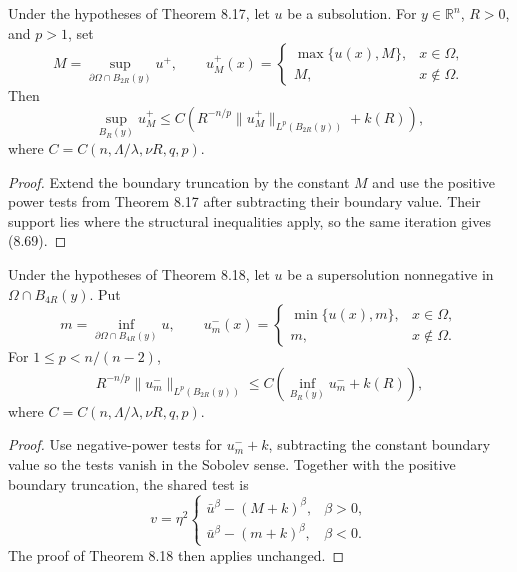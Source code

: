 \begin{theorem}
\label{gt-thm-8-25-boundary-local-boundedness}
Under the hypotheses of Theorem 8.17, let $u$ be a subsolution. For
$y\in\mathbb R^n$, $R>0$, and $p>1$, set
\[
M=\sup_{\partial\Omega\cap B_{2R}(y)}u^+,
\qquad
u_M^+(x)=
\begin{cases}
\max\{u(x),M\},&x\in\Omega,\\
M,&x\notin\Omega.
\end{cases}
\]
Then
\begin{equation}
\sup_{B_R(y)}u_M^+
\leq C\left(R^{-n/p}\|u_M^+\|_{L^p(B_{2R}(y))}+k(R)\right),
\tag{8.69}
\end{equation}
where $C=C(n,\Lambda/\lambda,\nu R,q,p)$.
\end{theorem}
\begin{proof}
\sketch Extend the boundary truncation by the constant $M$ and use the positive
power tests from Theorem 8.17 after subtracting their boundary value. Their
support lies where the structural inequalities apply, so the same iteration gives
(8.69).
\end{proof}

\begin{theorem}
\label{gt-thm-8-26-boundary-weak-harnack}
Under the hypotheses of Theorem 8.18, let $u$ be a supersolution nonnegative in
$\Omega\cap B_{4R}(y)$. Put
\[
m=\inf_{\partial\Omega\cap B_{4R}(y)}u,
\qquad
u_m^-(x)=
\begin{cases}
\min\{u(x),m\},&x\in\Omega,\\
m,&x\notin\Omega.
\end{cases}
\]
For $1\leq p<n/(n-2)$,
\begin{equation}
R^{-n/p}\|u_m^-\|_{L^p(B_{2R}(y))}
\leq C\left(\inf_{B_R(y)}u_m^-+k(R)\right),
\tag{8.70}
\end{equation}
where $C=C(n,\Lambda/\lambda,\nu R,q,p)$.
\end{theorem}
\begin{proof}
\sketch Use negative-power tests for $u_m^-+k$, subtracting the constant boundary
value so the tests vanish in the Sobolev sense. Together with the positive
boundary truncation, the shared test is
\begin{equation}
\tag{8.71}
v=\eta^2
\begin{cases}
\bar u^\beta-(M+k)^\beta,&\beta>0,\\
\bar u^\beta-(m+k)^\beta,&\beta<0.
\end{cases}
\end{equation}
The proof of Theorem 8.18 then
applies unchanged.
\end{proof}

